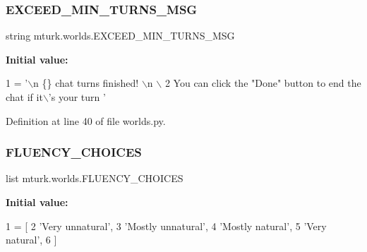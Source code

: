 \mbox{\label{namespacemturk_1_1worlds_a6baba41854cb64fcf5961b227e3e9c09}} 
\subsubsection{\texorpdfstring{E\+X\+C\+E\+E\+D\+\_\+\+M\+I\+N\+\_\+\+T\+U\+R\+N\+S\+\_\+\+M\+SG}{EXCEED\_MIN\_TURNS\_MSG}}
{\footnotesize\ttfamily string mturk.\+worlds.\+E\+X\+C\+E\+E\+D\+\_\+\+M\+I\+N\+\_\+\+T\+U\+R\+N\+S\+\_\+\+M\+SG}

{\bfseries Initial value\+:}
\begin{DoxyCode}
1 =  \textcolor{stringliteral}{'\(\backslash\)n \{\} chat turns finished! \(\backslash\)n \(\backslash\)}
2 \textcolor{stringliteral}{        You can click the "Done" button to end the chat if it\(\backslash\)'s your turn '}
\end{DoxyCode}


Definition at line 40 of file worlds.\+py.

\mbox{\label{namespacemturk_1_1worlds_acfeb2fe7c200836d831a4eb5235ab0d6}} 
\subsubsection{\texorpdfstring{F\+L\+U\+E\+N\+C\+Y\+\_\+\+C\+H\+O\+I\+C\+ES}{FLUENCY\_CHOICES}}
{\footnotesize\ttfamily list mturk.\+worlds.\+F\+L\+U\+E\+N\+C\+Y\+\_\+\+C\+H\+O\+I\+C\+ES}

{\bfseries Initial value\+:}
\begin{DoxyCode}
1 =  [
2     \textcolor{stringliteral}{'Very unnatural'},
3     \textcolor{stringliteral}{'Mostly unnatural'},
4     \textcolor{stringliteral}{'Mostly natural'},
5     \textcolor{stringliteral}{'Very natural'},
6 ]
\end{DoxyCode}


